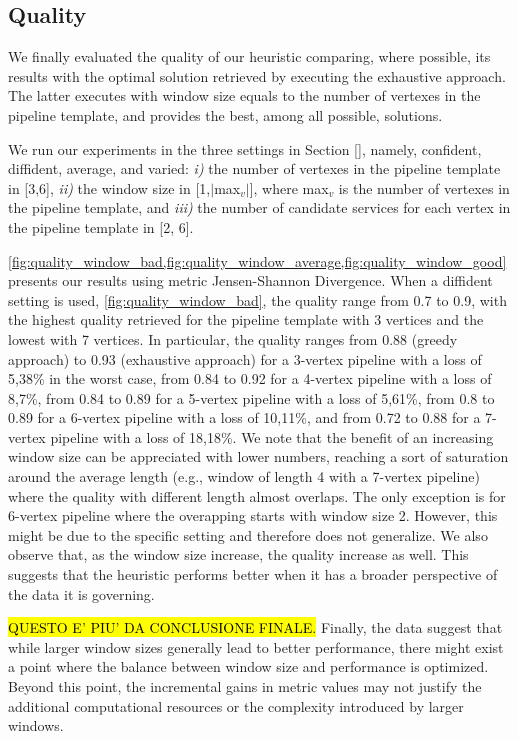 \subsection{Quality}\label{subsec:experiments_quality}
We finally evaluated the quality of our heuristic comparing, where possible, its results with the optimal solution retrieved by executing the exhaustive approach. The latter executes with window size equals to the number of vertexes in the pipeline template, and provides the best, among all possible, solutions.

We run our experiments in the three settings in Section \ref{}, namely, confident, diffident, average, and varied: \emph{i)} the number of vertexes in the pipeline template in [3,6], \emph{ii)} the window size in [1,$|$max$_v$$|$], where max$_v$ is the number of vertexes in the pipeline template, and \emph{iii)} the number of candidate services for each vertex in the pipeline template in [2, 6].

\cref{fig:quality_window_bad,fig:quality_window_average,fig:quality_window_good} presents our results using metric Jensen-Shannon Divergence.
%
When a diffident setting is used, \cref{fig:quality_window_bad}, the quality range from 0.7 to 0.9, with the highest quality retrieved for the pipeline template with 3 vertices and the lowest with 7 vertices.
In particular, the quality ranges from 0.88 (greedy approach) to 0.93 (exhaustive approach) for a 3-vertex pipeline with a loss of 5,38\% in the worst case, from 0.84 to 0.92 for a 4-vertex pipeline with a loss of 8,7\%, from 0.84 to 0.89 for a 5-vertex pipeline with a loss of 5,61\%, from 0.8 to 0.89 for a 6-vertex pipeline with a loss of 10,11\%, and from 0.72 to 0.88 for a 7-vertex pipeline with a loss of 18,18\%. We note that the benefit of an increasing window size can be appreciated with lower numbers, reaching a sort of saturation around the average length (e.g., window of length 4 with a 7-vertex pipeline) where the quality with different length almost overlaps. The only exception is for 6-vertex pipeline where the overapping starts with window size 2. However, this might be due to the specific setting and therefore does not generalize.
We also observe that, as the window size increase, the quality increase as well. This suggests that the heuristic performs better when it has a broader perspective of the data it is governing.

\hl{QUESTO E' PIU' DA CONCLUSIONE FINALE.} Finally, the data suggest that while larger window sizes generally lead to better performance, there might exist a point where the balance between window size and performance is optimized. Beyond this point, the incremental gains in metric values may not justify the additional computational resources or the complexity introduced by larger windows.


